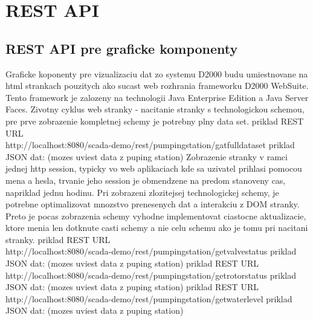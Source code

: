 %
%

\chapter{REST API}


\section{REST API pre graficke komponenty}
Graficke koponenty pre vizualizaciu dat zo systemu D2000 budu umiestnovane na html strankach pouzitych ako sucast web rozhrania frameworku D2000 WebSuite.
Tento framework je zalozeny na technologii Java Enterprise Edition a Java Server Faces.
Zivotny cyklus web stranky - nacitanie stranky s technologickou schemou, pre prve zobrazenie kompletnej schemy je potrebny plny data set.
priklad REST URL\\ http://localhost:8080/scada-demo/rest/pumpingstation/gatfulldataset
priklad JSON dat: (mozes uviest data z puping station)
Zobrazenie stranky v ramci jednej http session, typicky vo web aplikaciach kde sa uzivatel prihlasi pomocou mena a hesla, trvanie jeho session je obmendzene na predom stanoveny cas, napriklad jednu hodinu.
Pri zobrazeni zlozitejsej technologickej schemy, je potrebne optimalizovat mnozstvo prenesenych dat a interakciu z DOM stranky. Preto je pocas zobrazenia schemy vyhodne implementovat ciastocne aktualizacie, ktore
menia len dotknute casti schemy a nie celu schemu ako je tomu pri nacitani stranky.  
priklad REST URL\\ http://localhost:8080/scada-demo/rest/pumpingstation/getvalvestatus
priklad JSON dat: (mozes uviest data z puping station)
priklad REST URL\\ http://localhost:8080/scada-demo/rest/pumpingstation/getrotorstatus
priklad JSON dat: (mozes uviest data z puping station)
priklad REST URL\\ http://localhost:8080/scada-demo/rest/pumpingstation/getwaterlevel
priklad JSON dat: (mozes uviest data z puping station)


